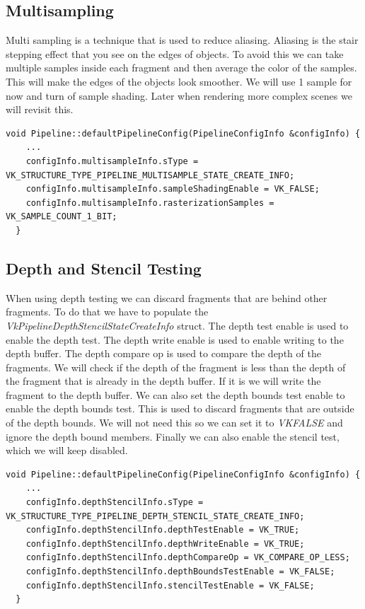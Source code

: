 \documentclass[12pt]{report} \usepackage{preamble}
\begin{document}
\subsection{Multisampling}

Multi sampling is a technique that is used to reduce aliasing. Aliasing is the stair stepping effect that you see on the edges of objects.
To avoid this we can take multiple samples inside each fragment and then average the color of the samples. This will make the edges
of the objects look smoother. We will use 1 sample for now and turn of sample shading. Later when rendering more complex scenes
we will revisit this.

\begin{lstlisting}[Language=C++]
void Pipeline::defaultPipelineConfig(PipelineConfigInfo &configInfo) {
    ...
    configInfo.multisampleInfo.sType = VK_STRUCTURE_TYPE_PIPELINE_MULTISAMPLE_STATE_CREATE_INFO;
    configInfo.multisampleInfo.sampleShadingEnable = VK_FALSE;
    configInfo.multisampleInfo.rasterizationSamples = VK_SAMPLE_COUNT_1_BIT;
  }
\end{lstlisting}

\subsection{Depth and Stencil Testing}

When using depth testing we can discard fragments that are behind other fragments. To do that we have to populate the
\textit{VkPipelineDepthStencilStateCreateInfo} struct. The depth test enable is used to enable the depth test. The depth
write enable is used to enable writing to the depth buffer. The depth compare op is used to compare the depth of the
fragments. We will check if the depth of the fragment is less than the depth of the fragment that is already in the
depth buffer. If it is we will write the fragment to the depth buffer. We can also set the depth bounds test enable
to enable the depth bounds test. This is used to discard fragments that are outside of the depth bounds. We will not
need this so we can set it to \textit{VK\textunderscore FALSE} and ignore the depth bound members. Finally we can also enable the stencil
test, which we will keep disabled.

\begin{lstlisting}[Language=C++]
void Pipeline::defaultPipelineConfig(PipelineConfigInfo &configInfo) {
    ...
    configInfo.depthStencilInfo.sType = VK_STRUCTURE_TYPE_PIPELINE_DEPTH_STENCIL_STATE_CREATE_INFO;
    configInfo.depthStencilInfo.depthTestEnable = VK_TRUE;
    configInfo.depthStencilInfo.depthWriteEnable = VK_TRUE;
    configInfo.depthStencilInfo.depthCompareOp = VK_COMPARE_OP_LESS;
    configInfo.depthStencilInfo.depthBoundsTestEnable = VK_FALSE;
    configInfo.depthStencilInfo.stencilTestEnable = VK_FALSE;
  }
\end{lstlisting}
\end{document}
